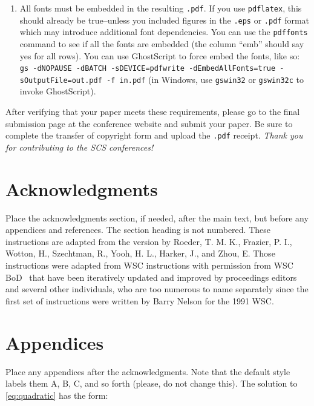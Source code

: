 \documentclass{scspaperproc}
\theoremstyle{scsthe}
\begin{document}
\begin{enumerate}
        \begin{enumerate}
            \item Be sure that hyperlinks will probably work in the future as well.
            \item Live hyperlinks are blue. Nonlive hyperlinks are black (default in this template).
            \item \textbf{Use descriptive link text (e.g., “Conference website”) rather than only raw URLs.}
        \end{enumerate}
        \item All fonts must be embedded in the resulting \texttt{.pdf}. If you use \texttt{pdflatex}, this should already be true--unless you included figures in the \texttt{.eps} or \texttt{.pdf} format which may introduce additional font dependencies. You can use the \texttt{pdffonts} command to see if all the fonts are embedded (the column ``emb'' should say yes for all rows). You can use GhostScript to force embed the fonts, like so: {\texttt{gs -dNOPAUSE -dBATCH -sDEVICE=pdfwrite -dEmbedAllFonts=true -sOutputFile=out.pdf -f in.pdf}} (in Windows, use \texttt{gswin32} or \texttt{gswin32c} to invoke GhostScript).
    \end{enumerate}
    After verifying that your paper meets these requirements, please go to the final submission page at the conference website and submit your paper. Be sure to complete the transfer of copyright form and upload the \texttt{.pdf} receipt. \textit{Thank you for contributing to the SCS conferences!}


    \section*{Acknowledgments}

    Place the acknowledgments section, if needed, after the main text, but before any appendices and references. The section heading is not numbered. These instructions are adapted from the version by Roeder, T. M. K., Frazier, P. I., Wotton, H., Szechtman, R., Yooh, H. L., Harker, J., and Zhou, E. Those instructions were adapted from WSC instructions with permission from WSC BoD~\cite{WSC} that have been iteratively updated and improved by proceedings editors and several other individuals, who are too numerous to name separately since the first set of instructions were written by Barry Nelson for the 1991 WSC.

    \appendix

    \section{Appendices} \label{app:quadratic}
    Place any appendices after the acknowledgments. Note that the default style labels them A, B, C, and so forth (please, do not change this).
    The solution to \eqref{eq:quadratic} has the form:
\end{document}
